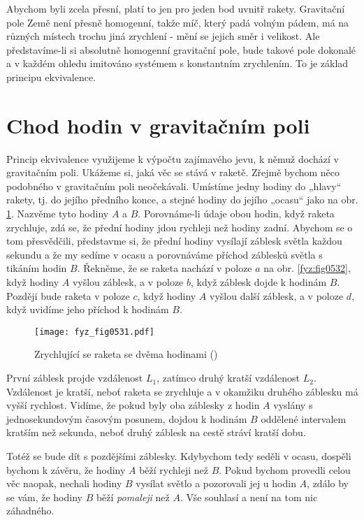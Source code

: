     Abychom byli zcela přesní, platí to jen pro jeden bod uvnitř rakety. Gravitační pole Země není 
    přesně homogenní, takže míč, který padá volným pádem, má na různých místech trochu jiná 
    zrychlení - mění se jejich směr i velikost. Ale představíme-li si absolutně homogenní 
    gravitační pole, bude takové pole dokonalé a v každém ohledu imitováno systémem s konstantním 
    zrychlením. To je základ principu ekvivalence.
    
  \section{Chod hodin v gravitačním poli}\label{fyz:IIchapXLIIsecVI}
    Princip ekvivalence využijeme k výpočtu zajímavého jevu, k němuž dochází v gravitačním poli. 
    Ukážeme si, jaká věc se stává v raketě. Zřejmě bychom něco podobného v gravitačním poli 
    neočekávali. Umístíme jedny hodiny do „hlavy“ rakety, tj. do jejího předního konce, a stejné 
    hodiny do jejího „ocasu“ jako na obr. \ref{fyz:fig0531}. Nazvěme tyto hodiny \(A\) a \(B\). 
    Porovnáme-li údaje obou hodin, když raketa zrychluje, zdá se, že přední hodiny jdou rychleji 
    než hodiny zadní. Abychom se o tom přesvědčili, představme si, že přední hodiny vysílají 
    záblesk světla každou sekundu a že my sedíme v ocasu a porovnáváme příchod záblesků světla s 
    tikáním hodin \(B\). Řekněme, že se raketa nachází v poloze \(a\) na obr. \ref{fyz:fig0532}, 
    když hodiny \(A\) vyšlou záblesk, a v poloze \(b\), když záblesk dojde k hodinám \(B\). Později 
    bude raketa v poloze \(c\), když hodiny \(A\) vyšlou další záblesk, a v poloze \(d\), když 
    uvidíme jeho příchod k hodinám \(B\).
    

    \begin{figure}[ht!] %
      \centering
      \texttt{[image: fyz\_fig0531.pdf]}
      \caption{Zrychlující se raketa se dvěma hodinami (\cite[s.~786]{Feynman02})}
      \label{fyz:fig0531}
    \end{figure}
    
    První záblesk projde vzdálenost \(L_1\), zatímco druhý kratší vzdálenost \(L_2\). Vzdálenost je 
    kratší, neboť raketa se zrychluje a v okamžiku druhého záblesku má vyšší rychlost. Vidíme, že 
    pokud byly oba záblesky z hodin \(A\) vyslány s jednosekundovým časovým posunem, dojdou k 
    hodinám \(B\) oddělené intervalem kratším než sekunda, neboť druhý záblesk na cestě stráví 
    kratší dobu.
    
    Totéž se bude dít s pozdějšími záblesky. Kdybychom tedy seděli v ocasu, dospěli bychom k 
    závěru, že hodiny \(A\) běží rychleji než \(B\). Pokud bychom provedli celou věc naopak, 
    nechali hodiny \(B\) vysílat světlo a pozorovali jej u hodin \(A\), zdálo by se vám, že hodiny 
    \(B\) běží \emph{pomaleji} než \(A\). Vše souhlasí a není na tom nic záhadného.
    
